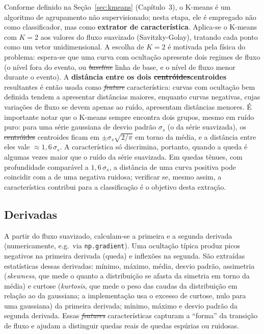 \documentclass[msc]{on} %
\makeatletter
\providecommand{\DIFaddtex}[1]{{\protect\color{red}#1}} %
\providecommand{\DIFdeltex}[1]{{\protect\color{red}\sout{#1}}} %
\providecommand{\DIFaddbegin}{} %
\providecommand{\DIFaddend}{} %
\providecommand{\DIFdelbegin}{} %
\providecommand{\DIFdelend}{} %
\providecommand{\DIFadd}[1]{\texorpdfstring{\DIFaddtex{#1}}{#1}} %
\providecommand{\DIFdel}[1]{\texorpdfstring{\DIFdeltex{#1}}{}} %
\let\sout@orig\sout %
\renewcommand{\sout}[1]{\ifmmode\text{\sout@orig{\ensuremath{#1}}}\else\sout@orig{#1}\fi} %
\makeatother
\begin{document}
Conforme definido na Seção~\ref{sec:kmeans} (Capítulo~3), o K-means é um algoritmo de agrupamento não supervisionado; nesta etapa, ele é empregado não como classificador, mas como \textbf{extrator de característica}. Aplica-se o K-means com \(K=2\) aos valores do fluxo suavizado (Savitzky-Golay), tratando cada ponto como um vetor unidimensional. A escolha de \(K=2\) é motivada pela física do problema: espera-se que uma curva com ocultação apresente dois regimes de fluxo (o nível fora do evento, ou \DIFdelbegin \textit{\DIFdel{baseline}}%
\DIFdelend\ifhmode\hskip0pt\fi \DIFaddbegin \DIFadd{linha de base}\DIFaddend , e o nível de fluxo menor durante o evento). A \textbf{distância entre os dois \DIFdelbegin \DIFdel{centróides}\DIFdelend\ifhmode\hskip0pt\fi \DIFaddbegin \DIFadd{centroides}\DIFaddend } resultantes é então usada como \DIFdelbegin \textit{\DIFdel{feature}}%
\DIFdelend\ifhmode\hskip0pt\fi \DIFaddbegin \DIFadd{característica}\DIFaddend : curvas com ocultação bem definida tendem a apresentar distâncias maiores, enquanto curvas negativas, cujas variações de fluxo se devem apenas ao ruído, apresentam distâncias menores. É importante notar que o K-means sempre encontra dois grupos, mesmo em ruído puro: para uma série gaussiana de desvio padrão \(\sigma_s\) (o da série suavizada), os \DIFdelbegin \DIFdel{centróides }\DIFdelend\ifhmode\hskip0pt\fi \DIFaddbegin \DIFadd{centroides }\DIFaddend ficam em \(\pm\sigma_s\sqrt{2/\pi}\) em torno da média, e a distância entre eles vale \(\approx 1{,}6\,\sigma_s\). A característica só discrimina, portanto, quando a queda é algumas vezes maior que o ruído da série suavizada. Em quedas tênues, com profundidade comparável a \(1{,}6\,\sigma_s\), a distância de uma curva positiva pode coincidir com a de uma negativa ruidosa; verificar se, mesmo assim, a característica contribui para a classificação é o objetivo desta extração.

\subsection{Derivadas}

A partir do fluxo suavizado, calculam-se a primeira e a segunda derivada (numericamente, e.g.\ via \texttt{np.gradient}). Uma ocultação típica produz picos negativos na primeira derivada (queda) e inflexões na segunda. São extraídas estatísticas dessas derivadas: mínimo, máximo, média, desvio padrão, assimetria (\textit{skewness}, que mede o quanto a distribuição se afasta da simetria em torno da média) e curtose (\textit{kurtosis}, que mede o peso das caudas da distribuição em relação ao da gaussiana; a implementação usa o excesso de curtose, nulo para uma gaussiana) da primeira derivada; mínimo, máximo e desvio padrão da segunda derivada. Essas \DIFdelbegin \textit{\DIFdel{features}} %
\DIFdelend\ifhmode\hskip0pt\fi \DIFaddbegin \DIFadd{características }\DIFaddend capturam a ``forma'' da transição de fluxo e ajudam a distinguir quedas reais de quedas espúrias ou ruidosas.
\end{document}
